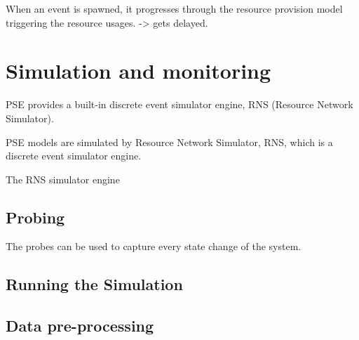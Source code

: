 When an event is spawned, it progresses through the resource provision model triggering the resource usages. -> gets delayed.

\section{Simulation and monitoring}
PSE provides a built-in discrete event simulator engine, RNS (Resource Network Simulator).

PSE models are simulated by Resource Network Simulator, RNS, which is a discrete event simulator engine.

The RNS simulator engine












\subsection{Probing}
The probes can be used to capture every state change of the system.

\subsection{Running the Simulation}
\subsection{Data pre-processing}



